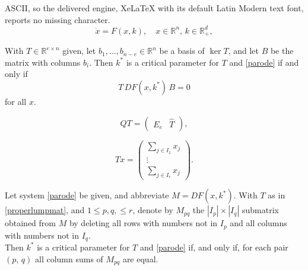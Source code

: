\documentclass[10pt,a4paper]{amsart}
\begin{document}
ASCII, so the delivered engine, XeLaTeX with its default Latin Modern text font, reports no missing character.
\begin{equation}\label{parode}
\dot x=F(x,k), \quad x\in \mathbb R^n,\, k\in \mathbb R_{+}^d,
\end{equation}

\begin{lemma}\label{lalem}
With $T\in\mathbb R^{e\times n}$ given, let $b_1,\ldots,b_{n-e}\in\mathbb R^n$ be a basis of $\ker T$, and let $B$ be the matrix with columns $b_i$. Then $k^*$ is a critical parameter for $T$ and \eqref{parode} if and only if 
\begin{equation}\label{linparcond}
T\,DF(x,k^*)\,B=0
\end{equation}
for all $x$.
\end{lemma} 

    \begin{equation}\label{rowech}
         QT=\begin{pmatrix}
        E_e & \widehat T
    \end{pmatrix},
    \end{equation}

\begin{equation}\label{properlumpmat}
 Tx=\begin{pmatrix} \sum_{j\in I_1} x_j \\ \vdots \\ \sum_{j\in I_r} x_j\end{pmatrix}.
\end{equation}

\begin{proposition}\label{colslem} Let system \eqref{parode} be given, and abbreviate $M=DF(x,k^*)$. With $T$ as in \eqref{properlumpmat}, and $1\leq p,q,\leq r$, denote by  $M_{pq}$  the $|I_p|\times |I_q|$ submatrix obtained from $M$ by deleting all rows with numbers not in $I_p$ and all columns with numbers not in $I_q$. \\
Then  $k^*$ is a critical parameter for $T$ and \eqref{parode} if, and only if, for each pair $(p,\, q)$ all column sums of $M_{pq}$ are equal.
\end{proposition}
\end{document}
